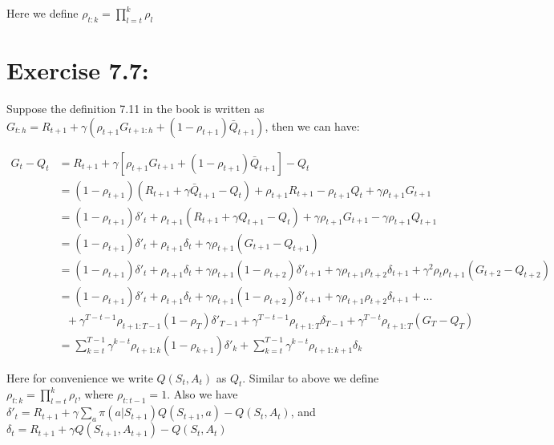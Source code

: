 \documentclass[10pt,letterpaper]{article}
\begin{document}
Here we define $\rho_{t:k} = \prod_{l=t}^{k}\rho_l$

\section*{Exercise 7.7: }
\label{7.7}

Suppose the definition 7.11 in the book is written as $G_{t:h} = R_{t+1} + \gamma(\rho_{t+1}G_{t+1:h} + (1-\rho_{t+1})\bar{Q}_{t+1})$, then we can have:

\begin{align*}
G_t - Q_t &= R_{t+1} + \gamma[\rho_{t+1}G_{t+1} + (1-\rho_{t+1})\bar{Q}_{t+1}] - Q_t\\
&= (1 - \rho_{t+1})(R_{t+1} + \gamma\bar{Q}_{t+1} - Q_t) + \rho_{t+1}R_{t+1} -\rho_{t+1}Q_t + \gamma\rho_{t+1}G_{t+1}\\
&= (1 - \rho_{t+1})\delta'_t + \rho_{t+1}(R_{t+1} + \gamma Q_{t+1} - Q_t) + \gamma\rho_{t+1}G_{t+1} - \gamma\rho_{t+1}Q_{t+1}\\
&= (1 - \rho_{t+1})\delta'_t + \rho_{t+1}\delta_t + \gamma\rho_{t+1}(G_{t+1} - Q_{t+1})\\
&= (1 - \rho_{t+1})\delta'_t + \rho_{t+1}\delta_t + \gamma\rho_{t+1}(1 - \rho_{t+2})\delta'_{t+1} + \gamma\rho_{t+1}\rho_{t+2}\delta_{t+1} +\gamma^2\rho_t\rho_{t+1}(G_{t+2} - Q_{t+2})\\
&= (1 - \rho_{t+1})\delta'_t + \rho_{t+1}\delta_t + \gamma\rho_{t+1}(1 - \rho_{t+2})\delta'_{t+1} + \gamma\rho_{t+1}\rho_{t+2}\delta_{t+1} + ... \\
& \ \ \  + \gamma^{T-t-1}\rho_{t+1:T-1}(1 - \rho_{T})\delta'_{T-1} + \gamma^{T-t-1}\rho_{t+1:T}\delta_{T-1} + \gamma^{T-t}\rho_{t+1:T}(G_T - Q_T)\\
&= \sum_{k=t}^{T-1}\gamma^{k-t}\rho_{t+1:k}(1-\rho_{k+1})\delta'_k + \sum_{k=t}^{T-1}\gamma^{k-t}\rho_{t+1:k+1}\delta_k
\end{align*}

Here for convenience we write $Q(S_t, A_t)$ as $Q_t$. Similar to above we define $\rho_{t:k} = \prod_{l=t}^{k}\rho_l$, where $\rho_{t:t-1} = 1$. Also we have $\delta'_t = R_{t+1} + \gamma\sum_a\pi(a|S_{t+1})Q(S_{t+1},a)-Q(S_t,A_t)$, and $\delta_t = R_{t+1} + \gamma Q(S_{t+1},A_{t+1})-Q(S_t,A_t)$


\clearpage
\end{document}
